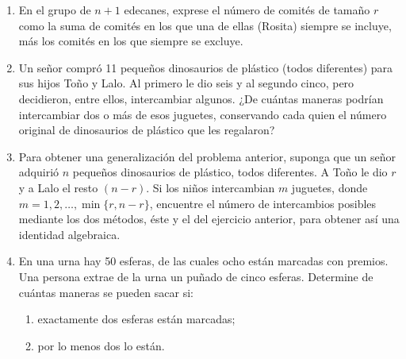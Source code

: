 \begin{Ejer}
\begin{enumerate}
\item En el grupo de $n+1$ edecanes, exprese el n\'umero de comit\'es de tama\~no $r$ como la suma de comit\'es en los que una de ellas (Rosita) siempre se incluye, m\'as los comit\'es en los que siempre se excluye.

\item Un se\~nor compr\'o 11 peque\~nos dinosaurios de pl\'astico (todos diferentes) para sus hijos To\~no y Lalo. Al primero le dio seis y al segundo cinco, pero decidieron, entre ellos, intercambiar algunos. ¿De cu\'antas maneras podr\'ian intercambiar dos o m\'as de esos juguetes, conservando cada quien el n\'umero original de dinosaurios de pl\'astico que les regalaron?

\item Para obtener una generalizaci\'on del problema anterior, suponga que un se\~nor adquiri\'o $n$ peque\~nos dinosaurios de pl\'astico, todos diferentes. A To\~no le dio $r$ y a Lalo el resto $(n-r)$. Si los ni\~nos intercambian $m$ juguetes, donde $m=1,2,\ldots,\min\{r,n-r\}$, encuentre el n\'umero de intercambios posibles mediante los dos m\'etodos, \'este y el del ejercicio anterior, para obtener as\'i una identidad algebraica.

\item En una urna hay 50 esferas, de las cuales ocho est\'an marcadas con premios. Una persona extrae de la urna un pu\~nado de cinco esferas. Determine de cu\'antas maneras se pueden sacar si:
\begin{enumerate}
\item exactamente dos esferas est\'an marcadas;
\item por lo menos dos lo est\'an.
\end{enumerate}

\end{enumerate}
\end{Ejer}

